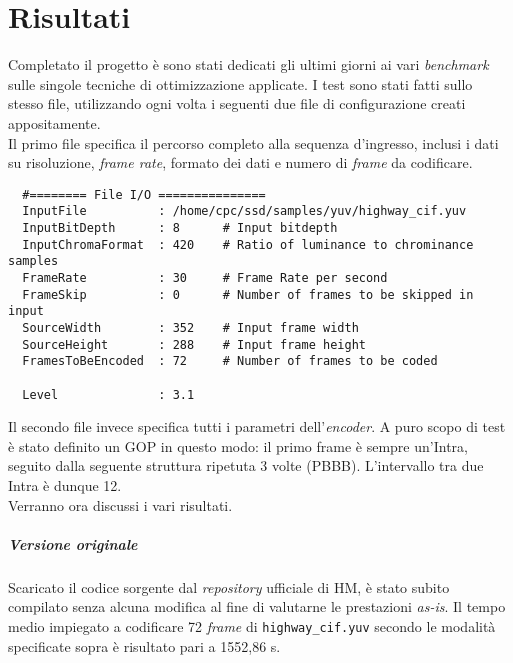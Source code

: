 
\chapter{Risultati} %

\label{Chapter7} %


Completato il progetto è sono stati dedicati gli ultimi giorni ai vari 
\emph{benchmark} sulle singole tecniche di ottimizzazione applicate. 
I test sono stati fatti sullo stesso file, utilizzando ogni volta i seguenti 
due file di configurazione creati appositamente.\\

Il primo file specifica il percorso completo alla sequenza d'ingresso, inclusi 
i dati su risoluzione, \emph{frame rate}, formato dei dati e numero di 
\emph{frame} da codificare.
\begin{lstlisting}
  #======== File I/O ===============
  InputFile          : /home/cpc/ssd/samples/yuv/highway_cif.yuv
  InputBitDepth      : 8      # Input bitdepth
  InputChromaFormat  : 420    # Ratio of luminance to chrominance samples
  FrameRate          : 30     # Frame Rate per second
  FrameSkip          : 0      # Number of frames to be skipped in input
  SourceWidth        : 352    # Input frame width
  SourceHeight       : 288    # Input frame height
  FramesToBeEncoded  : 72     # Number of frames to be coded
  
  Level              : 3.1
\end{lstlisting}

Il secondo file invece specifica tutti i parametri dell'\emph{encoder}. A puro 
scopo di test è stato definito un GOP in questo modo: il primo frame è sempre 
un'Intra, seguito dalla seguente struttura ripetuta 3 volte (PBBB). 
L'intervallo tra due Intra è dunque 12. \\

Verranno ora discussi i vari risultati.

\paragraph{Versione originale \\}
  Scaricato il codice sorgente dal \emph{repository} ufficiale di HM, è stato 
  subito compilato senza alcuna modifica al fine di valutarne le prestazioni 
  \emph{as-is}. Il tempo medio impiegato a codificare 72 \emph{frame} di 
  \verb|highway_cif.yuv| secondo le modalità specificate sopra è risultato pari 
  a 1552,86 s.

